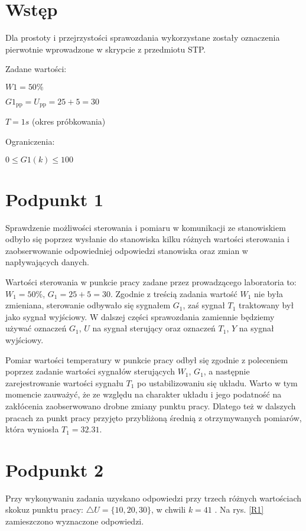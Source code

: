 \chapter{Wstęp}
Dla prostoty i przejrzystości sprawozdania wykorzystane zostały oznaczenia pierwotnie wprowadzone w skrypcie z przedmiotu STP.

\bigskip

Zadane wartości:

\smallskip

$W1=50\%$

\smallskip

$G1_{\mathrm{pp}}=U_{\mathrm{pp}}=25+5=30$

\smallskip

$T=1s$ (okres próbkowania)

\bigskip

Ograniczenia:

\smallskip

$0 \le G1(k) \le 100$

\chapter{Podpunkt 1}
Sprawdzenie możliwości sterowania i pomiaru w komunikacji ze stanowiskiem odbyło się poprzez wysłanie do stanowiska kilku różnych wartości sterowania i zaobserwowanie odpowiedniej odpowiedzi stanowiska oraz zmian w napływających danych.

Wartości sterowania w punkcie pracy zadane przez prowadzącego laboratoria to: $W_1=50\%$, $G_1=25+5=30$. Zgodnie z treścią zadania wartość $W_1$ nie była zmieniana, sterowanie odbywało się sygnałem $G_1$, zaś sygnał $T_1$ traktowany był jako sygnał wyjściowy. W dalszej części sprawozdania zamiennie będziemy używać oznaczeń $G_1$, $U$ na sygnał sterujący oraz oznaczeń $T_1$, $Y$ na sygnał wyjściowy.

Pomiar wartości temperatury w punkcie pracy odbył się zgodnie z poleceniem poprzez zadanie wartości sygnałów sterujących $W_1$, $G_1$, a następnie zarejestrowanie wartości sygnału $T_1$ po ustabilizowaniu się układu. Warto w tym momencie zauważyć, że ze względu na charakter układu i jego podatność na zakłócenia zaobserwowano drobne zmiany punktu pracy. Dlatego też w dalszych pracach za punkt pracy przyjęto przybliżoną średnią z otrzymywanych pomiarów, która wyniosła $T_1=\num{32,31}$.


\chapter{Podpunkt 2}
Przy wykonywaniu zadania uzyskano odpowiedzi przy trzech różnych wartościach skokuz punktu pracy: $\triangle U = \{10, 20, 30\}$, w chwili $k=\num{41}$ . Na rys. \ref{R1} zamieszczono wyznaczone odpowiedzi.

